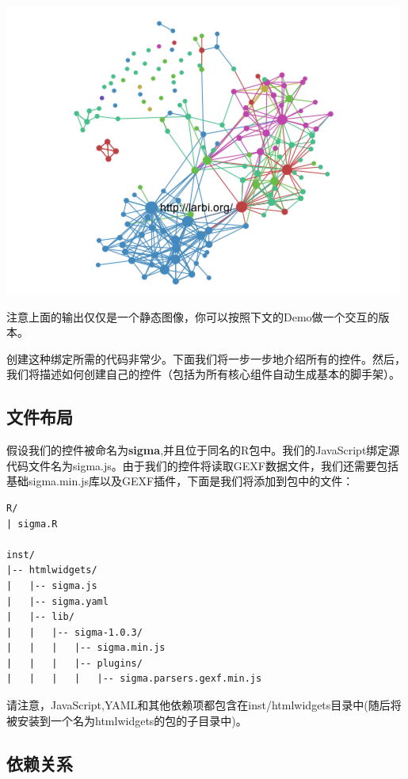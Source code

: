 \documentclass[]{book}
\theoremstyle{definition}
\theoremstyle{definition}
\theoremstyle{definition}
\theoremstyle{remark}
\begin{document}
\begin{center}\includegraphics{pic/ch1_1} \end{center}

注意上面的输出仅仅是一个静态图像，你可以按照下文的Demo做一个交互的版本。

创建这种绑定所需的代码非常少。下面我们将一步一步地介绍所有的控件。然后，我们将描述如何创建自己的控件（包括为所有核心组件自动生成基本的脚手架）。

\subsection{文件布局}

假设我们的控件被命名为\textbf{sigma},并且位于同名的R包中。我们的JavaScript绑定源代码文件名为sigma.js。由于我们的控件将读取GEXF数据文件，我们还需要包括基础sigma.min.js库以及GEXF插件，下面是我们将添加到包中的文件：

\begin{verbatim}
R/
| sigma.R

inst/
|-- htmlwidgets/
|   |-- sigma.js
|   |-- sigma.yaml
|   |-- lib/
|   |   |-- sigma-1.0.3/
|   |   |   |-- sigma.min.js
|   |   |   |-- plugins/
|   |   |   |   |-- sigma.parsers.gexf.min.js
\end{verbatim}

请注意，JavaScript,YAML和其他依赖项都包含在inst/htmlwidgets目录中(随后将被安装到一个名为htmlwidgets的包的子目录中)。

\subsection{依赖关系}
\end{document}
